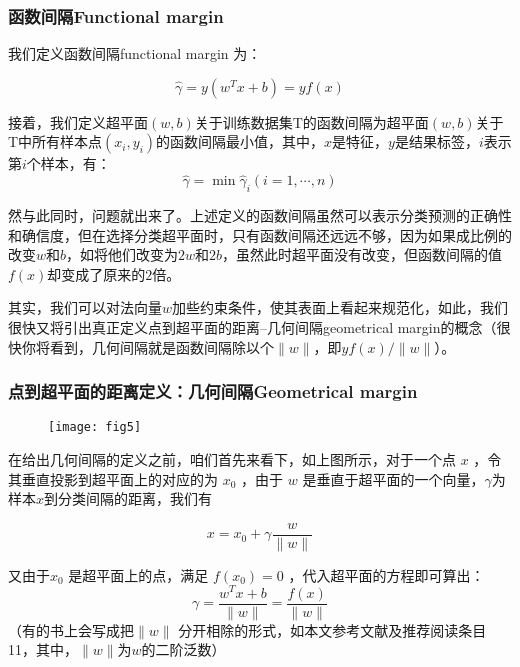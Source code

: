 \documentclass[a4paper,12pt]{article}
\begin{document}
\subsubsection{函数间隔Functional margin}
我们定义函数间隔functional margin 为： 

\begin{equation}
\widehat{\gamma}=y(w^Tx+b)=yf(x)
\end{equation}

接着，我们定义超平面$(w,b)$关于训练数据集T的函数间隔为超平面$(w,b)$关于T中所有样本点$(x_i,y_i)$的函数间隔最小值，其中，$x$是特征，$y$是结果标签，$i$表示第$i$个样本，有：
\begin{equation}
\widehat{\gamma}=\min\widehat{\gamma}_i(i=1,\cdots,n)
\end{equation}

然与此同时，问题就出来了。上述定义的函数间隔虽然可以表示分类预测的正确性和确信度，但在选择分类超平面时，只有函数间隔还远远不够，因为如果成比例的改变$w$和$b$，如将他们改变为$2w$和$2b$，虽然此时超平面没有改变，但函数间隔的值$f(x)$却变成了原来的$2$倍。

其实，我们可以对法向量$w$加些约束条件，使其表面上看起来规范化，如此，我们很快又将引出真正定义点到超平面的距离--几何间隔geometrical margin的概念（很快你将看到，几何间隔就是函数间隔除以个$\|w\|$，即$yf(x) / \|w\|$）。

\subsubsection{点到超平面的距离定义：几何间隔Geometrical margin}
\begin{figure}[H]
\centering
\texttt{[image: fig5]}
\end{figure}

在给出几何间隔的定义之前，咱们首先来看下，如上图所示，对于一个点 $x$ ，令其垂直投影到超平面上的对应的为 $x_0$ ，由于 $w$ 是垂直于超平面的一个向量，$\gamma$为样本$x$到分类间隔的距离，我们有

\begin{equation}
x=x_0+\gamma\frac{w}{\|w\|}
\end{equation}

又由于$ x_0$ 是超平面上的点，满足 $f(x_0)=0$ ，代入超平面的方程即可算出： 
\begin{equation}
\gamma=\frac{w^Tx+b}{\|w\|}=\frac{f(x)}{\|w\|}
\end{equation}
（有的书上会写成把$\|w\|$ 分开相除的形式，如本文参考文献及推荐阅读条目11，其中，$\|w\|$为$w$的二阶泛数）
\end{document}
